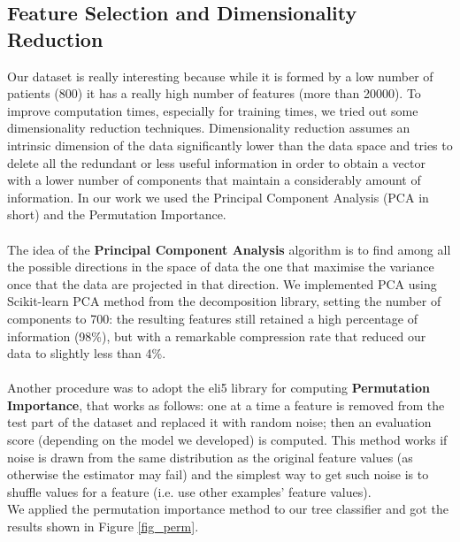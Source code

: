 \documentclass[12pt]{article}
\begin{document}
\subsection{Feature Selection and Dimensionality Reduction}
Our dataset is really interesting because while it is formed by a low number of patients (800) it has a really high number of features (more than 20000). To improve computation times, especially for training times, we tried out some dimensionality reduction techniques. Dimensionality reduction assumes an intrinsic dimension of the data significantly lower than the data space and tries to delete all the redundant or less useful information in order to obtain a vector with a lower number of components that maintain a considerably amount of information. In our work we used the Principal Component Analysis (PCA in short) and the Permutation Importance. \\ \\
The idea of the \textbf{Principal Component Analysis} algorithm is to find among all the possible directions in the space of data the one that maximise the variance once that the data are projected in that direction. We implemented  PCA using Scikit-learn PCA method from the decomposition library, setting the number of components to 700: the resulting features still retained a high percentage of information (98\%), but with a remarkable compression rate that reduced our data to slightly less than 4\%. \\ \\
Another procedure was to adopt the eli5 library \cite{pm} for computing \textbf{Permutation Importance}, that works as follows:
one at a time a feature is removed from the test part of the dataset and replaced it with random noise; then an evaluation score (depending on the model we developed) is computed. This method works if noise is drawn from the same distribution as the original feature values (as otherwise the estimator may fail) and the simplest way to get such noise is to shuffle values for a feature (i.e. use other examples' feature values). \\
We applied the permutation importance method to our tree classifier and got the results shown in Figure \ref{fig_perm}. \\
\end{document}
